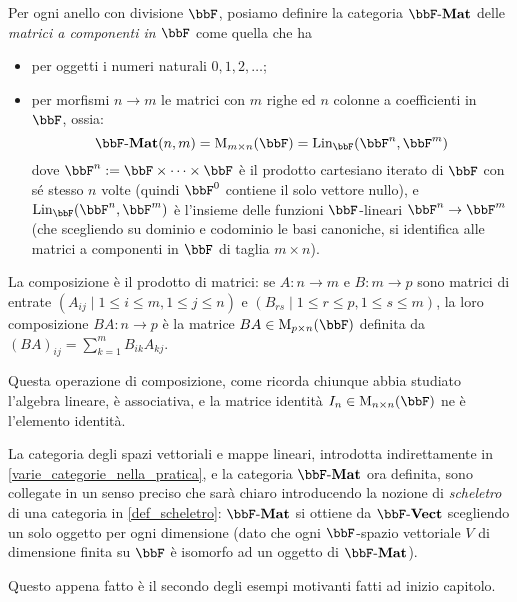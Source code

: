 \begin{example}\label{ex_cat_matrici}
	Per ogni anello con divisione \(\bbF\), posiamo definire la categoria \(\ctMat\) delle \emph{matrici a componenti in \(\bbF\)} come quella che ha
	\begin{itemize}
		\item per oggetti i numeri naturali \(0,1,2,\dots\);
		\item per morfismi \(n\to m\) le matrici con \(m\) righe ed \(n\) colonne a coefficienti in \(\bbF\), ossia:
		      \[\ctMat(n,m) = \matrici mn\bbF = \text{Lin}_{\bbF}(\bbF^n,\bbF^m)\]
		      dove \(\bbF^n:=\bbF \times\dots\times\bbF\) è il prodotto cartesiano iterato di \(\bbF\) con sé stesso \(n\) volte (quindi \(\bbF^0\) contiene il solo vettore nullo), e \(\text{Lin}_{\bbF}(\bbF^n,\bbF^m)\) è l'insieme delle funzioni \(\bbF\)-lineari \(\bbF^n\to\bbF^m\) (che scegliendo su dominio e codominio le basi canoniche, si identifica alle matrici a componenti in \(\bbF\) di taglia \(m\times n\)).
	\end{itemize}
	La composizione è il prodotto di matrici: se \(A : n\to m\) e \(B : m\to p\) sono matrici di entrate \((A_{ij}\mid 1\le i\le m,1\le j\le n)\) e \((B_{rs}\mid 1\le r\le p,1\le s\le m)\), la loro composizione \(BA : n\to p\) è la matrice \(BA\in \matrici pn\bbF\) definita da \((BA)_{ij} = \sum_{k=1}^m B_{ik}A_{kj}\).

	Questa operazione di composizione, come ricorda chiunque abbia studiato l'algebra lineare, è associativa, e la matrice identità \(I_n\in \matrici nn\bbF\) ne è l'elemento identità.
\end{example}
\begin{remark}
	La categoria degli spazi vettoriali e mappe lineari, introdotta indirettamente in \ref{varie_categorie_nella_pratica}, e la categoria \(\ctMat\) ora definita, sono collegate in un senso preciso che sarà chiaro introducendo la nozione di \emph{scheletro} di una categoria in \ref{def_scheletro}: \(\ctMat\) si ottiene da \(\ctVect\) scegliendo un solo oggetto per ogni dimensione (dato che ogni \(\bbF\)-spazio vettoriale \(V\) di dimensione finita su \(\bbF\) è isomorfo ad un oggetto di \(\ctMat\)).
\end{remark}
Questo appena fatto è il secondo degli esempi motivanti fatti ad inizio capitolo.
